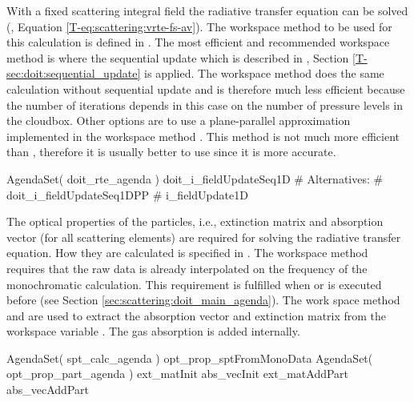 With a fixed scattering integral field the radiative transfer equation
can be solved (\theory, Equation \ref{T-eq:scattering:vrte-fs-av}). The workspace
method to be used for this calculation is defined in
. The most efficient and recommended
workspace method is  where the
sequential update which is described in \theory,
Section \ref{T-sec:doit:sequential_update} is applied. The workspace
method  does the same calculation
without 
sequential update and is therefore much less efficient because the
number of iterations depends in this case on the number of pressure
levels in the cloudbox.  Other options
are to use a plane-parallel approximation implemented in the workspace
method . This method is not
much more efficient than ,
therefore it is usually better to use
 since it is more accurate. 
\begin{code}
AgendaSet( doit_rte_agenda ){
     doit_i_fieldUpdateSeq1D
   # Alternatives:
   # doit_i_fieldUpdateSeq1DPP
   # i_fieldUpdate1D
   }
\end{code}
The optical properties of the particles, i.e., extinction matrix and
absorption vector (for all scattering elements) are required for solving the
radiative transfer equation. How they are calculated is specified in
. The workspace method
 requires that the raw data is
already interpolated on the frequency of the monochromatic
calculation. This requirement is fulfilled when
 or 
is executed before  (see
Section \ref{sec:scattering:doit_main_agenda}). The work space method
 and  are used to
extract the absorption vector  and extinction
matrix  from the workspace variable
. The gas absorption is added internally. 
\begin{code}
AgendaSet( spt_calc_agenda ){
   opt_prop_sptFromMonoData
}
AgendaSet( opt_prop_part_agenda ){
   ext_matInit
   abs_vecInit
   ext_matAddPart
   abs_vecAddPart
}
\end{code}


